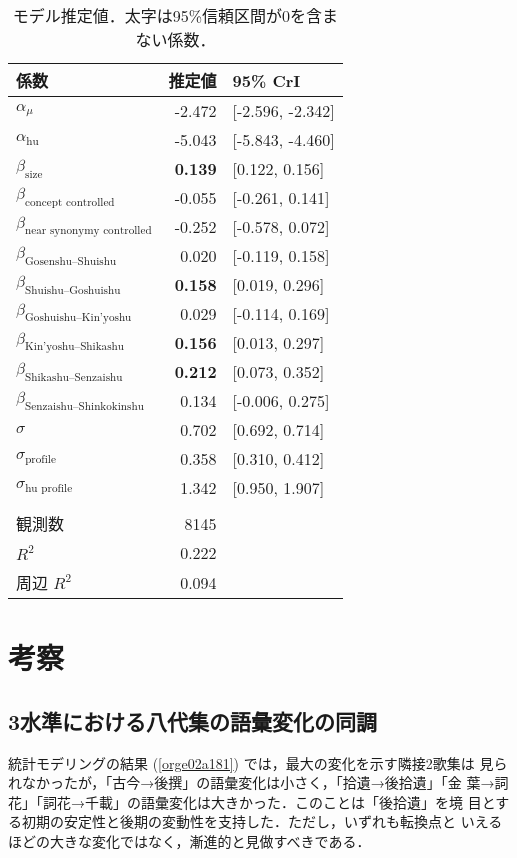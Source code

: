 \documentclass[submit]{ipsj}
\renewcommand{\ref}{\cref}
\begin{document}
\begin{table}[t]
\caption{\label{tab:orgcfa5ebb}モデル推定値．太字は95\%信頼区間が0を含まない係数．}
\centering
\begin{tabular}{lrl}
係数 & 推定値 & 95\% CrI\\
\hline
\(\alpha_{\mu}\) & -2.472 & {[}-2.596, -2.342]\\
\(\alpha_{\text{hu}}\) & -5.043 & {[}-5.843, -4.460]\\
\(\beta_{\text{size}}\) & \textbf{0.139} & {[}0.122, 0.156]\\
\(\beta_{\text{concept controlled}}\) & -0.055 & {[}-0.261, 0.141]\\
\(\beta_{\text{near synonymy controlled}}\) & -0.252 & {[}-0.578, 0.072]\\
\(\beta_{\text{Gosenshu--Shuishu}}\) & 0.020 & {[}-0.119, 0.158]\\
\(\beta_{\text{Shuishu--Goshuishu}}\) & \textbf{0.158} & {[}0.019, 0.296]\\
\(\beta_{\text{Goshuishu--Kin'yoshu}}\) & 0.029 & {[}-0.114, 0.169]\\
\(\beta_{\text{Kin'yoshu--Shikashu}}\) & \textbf{0.156} & {[}0.013, 0.297]\\
\(\beta_{\text{Shikashu--Senzaishu}}\) & \textbf{0.212} & {[}0.073, 0.352]\\
\(\beta_{\text{Senzaishu--Shinkokinshu}}\) & 0.134 & {[}-0.006, 0.275]\\
\(\sigma\) & 0.702 & {[}0.692, 0.714]\\
\(\sigma_{\text{profile}}\) & 0.358 & {[}0.310, 0.412]\\
\(\sigma_{\text{hu profile}}\) & 1.342 & {[}0.950, 1.907]\\
 &  & \\
観測数 & 8145 & \\
\(R^2\) & 0.222 & \\
周辺 \(R^2\) & 0.094 & \\
\end{tabular}
\end{table}
\section{考察\label{org5ab407f}}
\label{sec:org4694afa}
\subsection{3水準における八代集の語彙変化の同調\label{org06b2ea6}}
\label{sec:orgb5f6507}
統計モデリングの結果 (\ref{orge02a181}) では，最大の変化を示す隣接2歌集は
見られなかったが，「古今→後撰」の語彙変化は小さく，「拾遺→後拾遺」「金
葉→詞花」「詞花→千載」の語彙変化は大きかった．このことは「後拾遺」を境
目とする初期の安定性と後期の変動性を支持した．ただし，いずれも転換点と
いえるほどの大きな変化ではなく，漸進的と見做すべきである．
\end{document}
